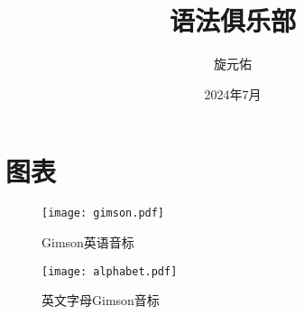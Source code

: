 \documentclass{yufa}
\title{语法俱乐部}
\author{旋元佑}
\date{2024年7月}
\begin{document}

\frontmatter
\maketitle

\tableofcontents

% 
\mainmatter


% 

\appendix

\chapter{图表}
\cleardoublepage

\begin{figure}[htbp!]
  \centering
  \texttt{[image: gimson.pdf]}
  \caption{\label{fig:gimson}Gimson英语音标}

  \bigskip

  \texttt{[image: alphabet.pdf]}
  \caption{\label{fig:alphabet}英文字母Gimson音标}

\end{figure}

\backmatter
\end{document}
